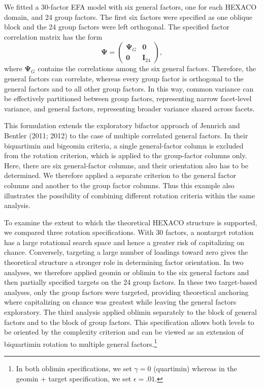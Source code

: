 \documentclass[
  12pt,
  letterpaper,
  article]{scrartcl}
\begin{document}
We fitted a 30-factor EFA model with six general factors, one for each
HEXACO domain, and 24 group factors. The first six factors were
specified as one oblique block and the 24 group factors were left
orthogonal. The specified factor correlation matrix has the form \[
\boldsymbol{\Psi}=
\begin{pmatrix}
\boldsymbol{\Psi}_{G} & \mathbf{0}\\
\mathbf{0} & \mathbf{I}_{24}
\end{pmatrix},
\] where \(\boldsymbol{\Psi}_{G}\) contains the correlations among the
six general factors. Therefore, the general factors can correlate,
whereas every group factor is orthogonal to the general factors and to
all other group factors. In this way, common variance can be effectively
partitioned between group factors, representing narrow facet-level
variance, and general factors, representing broader variance shared
across facets.

This formulation extends the exploratory bifactor approach of Jennrich
and Bentler (2011; 2012) to the case of multiple correlated general
factors. In their biquartimin and bigeomin criteria, a single
general-factor column is excluded from the rotation criterion, which is
applied to the group-factor columns only. Here, there are six
general-factor columns, and their orientation also has to be determined.
We therefore applied a separate criterion to the general factor columns
and another to the group factor columns. Thus this example also
illustrates the possibility of combining different rotation criteria
within the same analysis.

To examine the extent to which the theoretical HEXACO structure is
supported, we compared three rotation specifications. With 30 factors, a
nontarget rotation has a large rotational search space and hence a
greater risk of capitalizing on chance. Conversely, targeting a large
number of loadings toward zero gives the theoretical structure a
stronger role in determining factor orientation. In two analyses, we
therefore applied geomin or oblimin to the six general factors and then
partially specified targets on the 24 group factors. In these two
target-based analyses, only the group factors were targeted, providing
theoretical anchoring where capitalizing on chance was greatest while
leaving the general factors exploratory. The third analysis applied
oblimin separately to the block of general factors and to the block of
group factors. This specification allows both levels to be oriented by
the complexity criterion and can be viewed as an extension of
biquartimin rotation to multiple general factors.\footnote{In both
  oblimin specifications, we set \(\gamma=0\) (quartimin) whereas in the
  geomin + target specification, we set \(\epsilon=.01\).}
\end{document}
